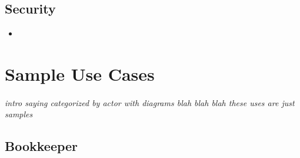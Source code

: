 \documentclass[12pt]{article}
\begin{document}
	\subsection{Security}
	\begin{itemize}
		\item 
	\end{itemize}

\section{Sample Use Cases}
\paragraph{} \textit{intro saying categorized by actor with diagrams blah blah blah these uses are just samples}

    \subsection{Bookkeeper}
\end{document}
